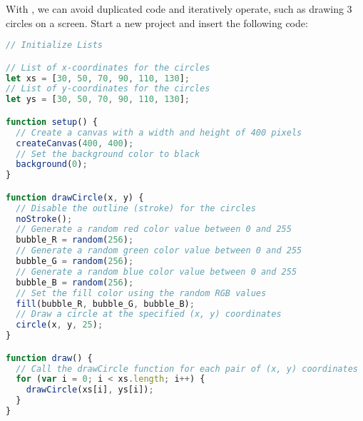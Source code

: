 \newpage
{}

\begin{exercisebox}[adjusted title= Introduction to Lists and For Loops]
With , we can avoid duplicated code and iteratively operate, such as drawing 3 circles on a screen.
Start a new project and insert the following code:

\begin{lstlisting}[language=JavaScript]
// Initialize Lists

// List of x-coordinates for the circles
let xs = [30, 50, 70, 90, 110, 130];
// List of y-coordinates for the circles
let ys = [30, 50, 70, 90, 110, 130];

function setup() {
  // Create a canvas with a width and height of 400 pixels
  createCanvas(400, 400);
  // Set the background color to black
  background(0);
}

function drawCircle(x, y) {
  // Disable the outline (stroke) for the circles
  noStroke();
  // Generate a random red color value between 0 and 255
  bubble_R = random(256);
  // Generate a random green color value between 0 and 255
  bubble_G = random(256);
  // Generate a random blue color value between 0 and 255
  bubble_B = random(256);
  // Set the fill color using the random RGB values
  fill(bubble_R, bubble_G, bubble_B);
  // Draw a circle at the specified (x, y) coordinates
  circle(x, y, 25);
}

function draw() {
  // Call the drawCircle function for each pair of (x, y) coordinates
  for (var i = 0; i < xs.length; i++) {
    drawCircle(xs[i], ys[i]);
  }
}
\end{lstlisting}
\end{exercisebox}

